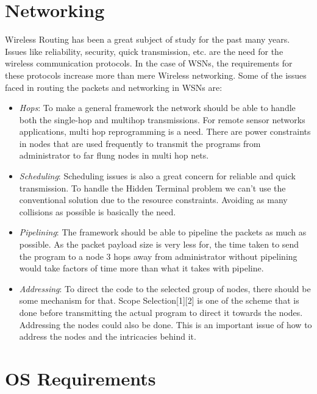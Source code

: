 \documentclass[twocolumn]{article}
\begin{document}
\section{Networking}

Wireless Routing has been a great subject of study for the past many years. Issues like reliability, security, quick transmission, etc. are the need for the wireless communication protocols. In the case of WSNs, the requirements for these protocols increase more than mere Wireless networking. Some of the issues faced in routing the packets and networking in WSNs are:
\begin{itemize}
\item \emph{Hops}: To make a general framework the network should be able to handle both the single-hop and multihop transmissions. For remote sensor networks applications, multi hop reprogramming is a need. There are power constraints in nodes that are used frequently to transmit the programs from administrator to far flung nodes in multi hop nets.

\item \emph{Scheduling}: Scheduling issues is also a great concern for reliable and quick transmission. To handle the Hidden Terminal problem we can’t use the conventional solution due to the resource constraints. Avoiding as many collisions as possible is basically the need.

\item \emph{Pipelining}: The framework should be able to pipeline the packets as much as possible. As the packet payload size is very less for, the time taken to send the program to a node 3 hops away from administrator without pipelining would take factors of time more than what it takes with pipeline.

\item \emph{Addressing}: To direct the code to the selected group of nodes, there should be some mechanism for that. Scope Selection[1][2] is one of the scheme that is done before transmitting the actual program to direct it towards the nodes. Addressing the nodes could also be done. This is an important issue of how to address the nodes and the intricacies behind it.
\end{itemize}

\section{OS Requirements}
\end{document}
